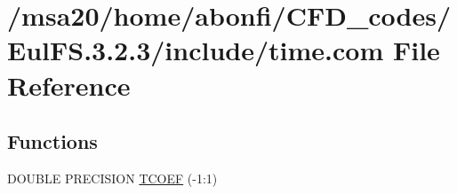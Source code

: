 \hypertarget{msa20_2home_2abonfi_2_c_f_d__codes_2_eul_f_s_83_82_83_2include_2time_8com}{\section{/msa20/home/abonfi/\-C\-F\-D\-\_\-codes/\-Eul\-F\-S.3.2.3/include/time.com File Reference}
\label{msa20_2home_2abonfi_2_c_f_d__codes_2_eul_f_s_83_82_83_2include_2time_8com}
}
\subsection*{Functions}
\begin{DoxyCompactItemize}
\item 
D\-O\-U\-B\-L\-E P\-R\-E\-C\-I\-S\-I\-O\-N \hyperlink{msa20_2home_2abonfi_2_c_f_d__codes_2_eul_f_s_83_82_83_2include_2time_8com_aad879029f2fa532de16a429259050a96}{T\-C\-O\-E\-F} (-\/1\-:1)
\end{DoxyCompactItemize}
